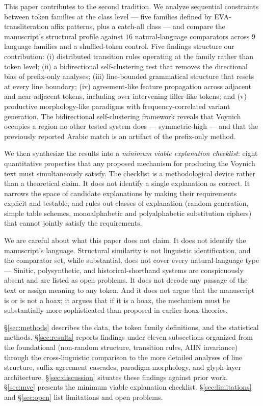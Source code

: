 \documentclass[11pt]{article}
\begin{document}
This paper contributes to the second tradition. We analyze sequential
constraints between token families at the class level --- five families
defined by EVA-transliteration affix patterns, plus a catch-all class ---
and compare the manuscript's structural profile against $16$ natural-language comparators across $9$ language families and a shuffled-token control. Five findings
structure our contribution: (i) distributed transition rules operating at
the family rather than token level; (ii) a bidirectional self-clustering
test that removes the directional bias of prefix-only analyses; (iii)
line-bounded grammatical structure that resets at every line boundary;
(iv) agreement-like feature propagation across adjacent and
near-adjacent tokens, including over intervening filler-like tokens; and
(v) productive morphology-like paradigms with frequency-correlated
variant generation. The bidirectional self-clustering framework reveals
that Voynich occupies a region no other tested system does ---
symmetric-high --- and that the previously reported Arabic match is an
artifact of the prefix-only method.

We then synthesize the results into a \emph{minimum viable explanation
checklist}: eight quantitative properties that any proposed mechanism for
producing the Voynich text must simultaneously satisfy. The checklist is
a methodological device rather than a theoretical claim. It does not
identify a single explanation as correct. It narrows the space of
candidate explanations by making their requirements explicit and
testable, and rules out classes of explanation (random generation, simple
table schemes, monoalphabetic and polyalphabetic substitution ciphers)
that cannot jointly satisfy the requirements.

We are careful about what this paper does not claim. It does not identify
the manuscript's language. Structural similarity is not linguistic
identification, and the comparator set, while substantial, does not cover
every natural-language type --- Sinitic, polysynthetic, and
historical-shorthand systems are conspicuously absent and are listed as
open problems. It does not decode any passage of the text or assign
meaning to any token. And it does not argue that the manuscript is or is
not a hoax; it argues that if it is a hoax, the mechanism must be
substantially more sophisticated than proposed in earlier hoax theories.

\S\ref{sec:methods} describes the data, the token family definitions, and
the statistical methods. \S\ref{sec:results} reports findings under
eleven subsections organized from the foundational (non-random
structure, transition rules, AIIN invariance) through the
cross-linguistic comparison to the more detailed analyses of line
structure, suffix-agreement cascades, paradigm morphology, and glyph-layer
architecture. \S\ref{sec:discussion} situates these findings against
prior work. \S\ref{sec:mve} presents the minimum viable explanation
checklist. \S\ref{sec:limitations} and \S\ref{sec:open} list limitations
and open problems.
\end{document}
